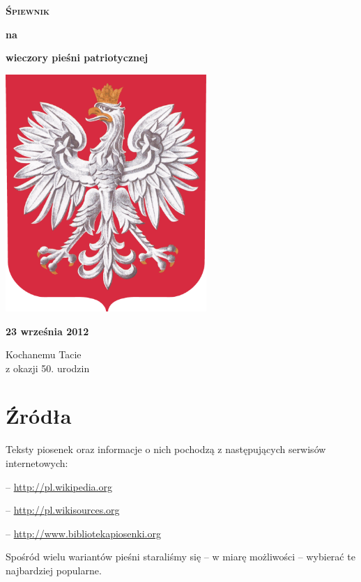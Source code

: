 \documentclass[a4paper,twoside,noinfo,frontmatter]{songbook}
\begin{document}
\begin{front}
\begin{titlepage}
\begin{center}
  {\VERYHUGE \bfseries\textsc{Śpiewnik}}

  \vspace{0.2in}
  {\Huge\bfseries na}
  \vspace{0.2in}
  
  {\HUGE\bfseries wieczory pieśni patriotycznej}
\end{center}
\vspace{0.5in}
\begin{center}
  \includegraphics[width=3in]{img/godlo-small.png}
\end{center}
\vspace{0.55in}
\begin{center}
  {\Huge\bfseries 23 września 2012}
\end{center}
\end{titlepage}

\begin{dedication}
  Kochanemu Tacie\\
  z okazji 50. urodzin
\end{dedication}
\end{front}



\cleartoleftpage
{}
\cleartoleftpage
{}

\section*{Źródła}

Teksty piosenek oraz informacje o nich pochodzą z następujących serwisów internetowych:
\begin{description}
  \setlength{\itemsep}{-1pt}
  \item[Wikipedia] -- \url{http://pl.wikipedia.org}
  \item[Wikiźródła] -- \url{http://pl.wikisources.org}
  \item[Biblioteka piosenki] -- \url{http://www.bibliotekapiosenki.org}
\end{description}

\noindent Spośród wielu wariantów pieśni staraliśmy się -- w miarę możliwości --
wybierać te najbardziej popularne.
\end{document}

